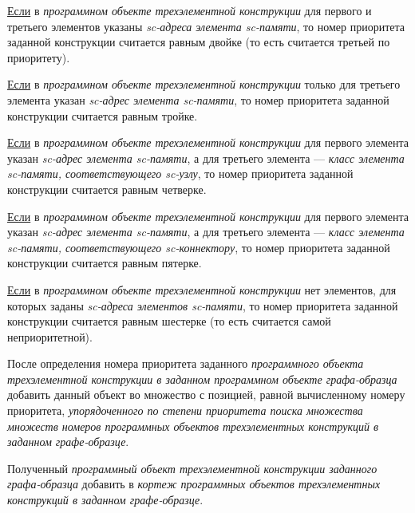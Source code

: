 \begin{SCn}
\begin{scnsubstruct}
\begin{scnsubstruct}
\begin{scnsubstruct}
\begin{scnsubstruct}
\begin{scnsubstruct}
\begin{scnsubstruct}
\begin{scnsubstruct}
\begin{scnsubstruct}
{\begin{scnitemize}
\begin{scnitemize}
					\item \uline{Если} в \textit{программном объекте трехэлементной конструкции} для первого и третьего элементов указаны \textit{sc-адреса элемента sc-памяти}, то номер приоритета заданной конструкции считается равным двойке (то есть считается третьей по приоритету).
					\item \uline{Если} в \textit{программном объекте трехэлементной конструкции} только для третьего элемента указан \textit{sc-адрес элемента sc-памяти}, то номер приоритета заданной конструкции считается равным тройке.
					\item \uline{Если} в \textit{программном объекте трехэлементной конструкции} для первого элемента указан \textit{sc-адрес элемента sc-памяти}, а для третьего элемента --- \textit{класс элемента sc-памяти, соответствующего sc-узлу\scnsupergroupsign}, то номер приоритета заданной конструкции считается равным четверке.
					\item \uline{Если} в \textit{программном объекте трехэлементной конструкции} для первого элемента указан \textit{sc-адрес элемента sc-памяти}, а для третьего элемента --- \textit{класс элемента sc-памяти, соответствующего sc-коннектору\scnsupergroupsign}, то номер приоритета заданной конструкции считается равным пятерке.
					\item \uline{Если} в \textit{программном объекте трехэлементной конструкции} нет элементов, для которых заданы \textit{sc-адреса элементов sc-памяти}, то номер приоритета заданной конструкции считается равным шестерке (то есть считается самой неприоритетной).
				\end{scnitemize}
				После определения номера приоритета заданного \textit{программного объекта трехэлементной конструкции в заданном программном объекте графа-образца} добавить данный объект во множество с позицией, равной вычисленному номеру приоритета, \textit{упорядоченного по степени приоритета поиска множества множеств номеров программных объектов трехэлементных конструкций в заданном графе-образце}.
				\item Полученный \textit{программный объект трехэлементной конструкции заданного графа-образца} добавить в \textit{кортеж программных объектов трехэлементных конструкций в заданном графе-образце}.
			\end{scnitemize}
			
}
\end{scnsubstruct}
\end{scnsubstruct}
\end{scnsubstruct}
\end{scnsubstruct}
\end{scnsubstruct}
\end{scnsubstruct}
\end{scnsubstruct}
\end{scnsubstruct}
\end{SCn}
